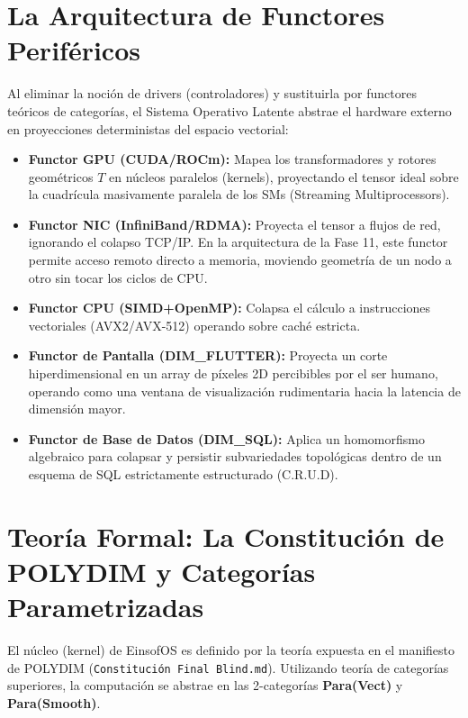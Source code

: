 \section{La Arquitectura de Functores Periféricos}
Al eliminar la noción de drivers (controladores) y sustituirla por functores teóricos de categorías, el Sistema Operativo Latente abstrae el hardware externo en proyecciones deterministas del espacio vectorial:
\begin{itemize}
    \item \textbf{Functor GPU (CUDA/ROCm):} Mapea los transformadores y rotores geométricos $T$ en núcleos paralelos (kernels), proyectando el tensor ideal sobre la cuadrícula masivamente paralela de los SMs (Streaming Multiprocessors).
    \item \textbf{Functor NIC (InfiniBand/RDMA):} Proyecta el tensor a flujos de red, ignorando el colapso TCP/IP. En la arquitectura de la Fase 11, este functor permite acceso remoto directo a memoria, moviendo geometría de un nodo a otro sin tocar los ciclos de CPU.
    \item \textbf{Functor CPU (SIMD+OpenMP):} Colapsa el cálculo a instrucciones vectoriales (AVX2/AVX-512) operando sobre caché estricta.
    \item \textbf{Functor de Pantalla (DIM\_FLUTTER):} Proyecta un corte hiperdimensional en un array de píxeles 2D percibibles por el ser humano, operando como una ventana de visualización rudimentaria hacia la latencia de dimensión mayor.
    \item \textbf{Functor de Base de Datos (DIM\_SQL):} Aplica un homomorfismo algebraico para colapsar y persistir subvariedades topológicas dentro de un esquema de SQL estrictamente estructurado (C.R.U.D).
\end{itemize}

\section{Teoría Formal: La Constitución de POLYDIM y Categorías Parametrizadas}
El núcleo (kernel) de EinsofOS es definido por la teoría expuesta en el manifiesto de POLYDIM (\texttt{Constitución Final Blind.md}). Utilizando teoría de categorías superiores, la computación se abstrae en las 2-categorías \textbf{Para(Vect)} y \textbf{Para(Smooth)}.


